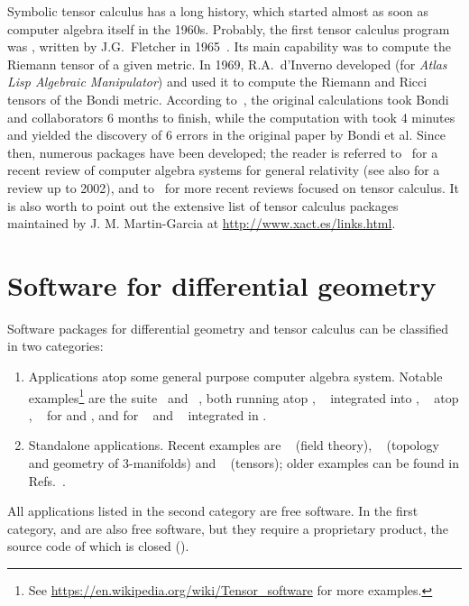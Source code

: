 Symbolic tensor calculus has a long history, which started
almost as soon as computer algebra itself in the 1960s.
Probably, the first tensor calculus program was , written by J.G.~Fletcher
in 1965~\cite{Fletc67}. Its main capability was to compute the Riemann tensor
of a given metric. In 1969, R.A.~d'Inverno developed 
(for \emph{Atlas Lisp Algebraic Manipulator}) and used it to compute
the Riemann and Ricci tensors of the Bondi metric.
According to~\cite{Skea94},
the original calculations took Bondi and collaborators 6 months to finish,
while the computation with  took 4 minutes and yielded the
discovery of 6 errors in the original paper by Bondi et al.
Since then, numerous packages have been developed; the reader is referred to~\cite{MacCa18}
for a recent review of computer algebra
systems for general relativity (see also \cite{MacCa02} for a review up to 2002), and to~\cite{KorolKS13,BirkaGSC17} for more recent reviews
focused on tensor calculus.
It is also worth to point out the extensive list of
tensor calculus packages maintained by J. M. Martin-Garcia at
\url{http://www.xact.es/links.html}.


\section{Software for differential geometry}

Software packages for differential geometry and tensor calculus can be
classified in two categories:
\begin{enumerate}
\item Applications atop some general purpose computer algebra system.
Notable examples\footnote{See \url{https://en.wikipedia.org/wiki/Tensor_software}
for more examples.} are
the  suite~\cite{Marti08} and ~\cite{ricci}, both
running atop ,
~\cite{AnderT12} integrated into ,
~\cite{grtensorIII} atop , ~\cite{atlas2}
for  and ,  and  for ~\cite{Toth05}
and
~\cite{sagemanifolds} integrated in .
\item Standalone applications. Recent examples are ~\cite{Peete07} (field theory),
~\cite{snappy} (topology and geometry of 3-manifolds)  and
~\cite{BolotP13} (tensors); older examples can be found in
Refs.~\cite{MacCa02,MacCa18}.
\end{enumerate}
All applications listed in the second category are free software. In
the first category,  and  are also free software, but
they require a proprietary product, the source code of which is closed ().

